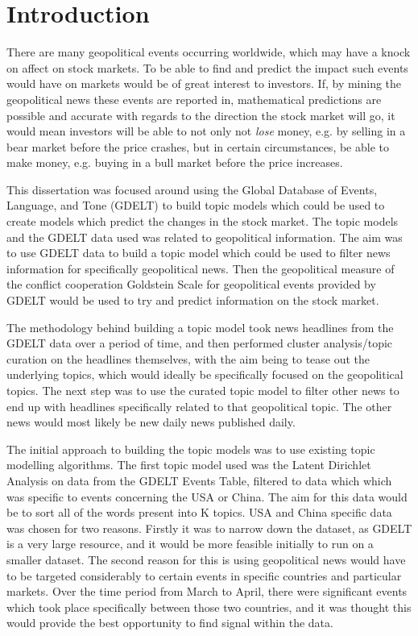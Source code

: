 \section{Introduction}
There are many geopolitical events occurring worldwide, which may have a knock on affect on stock markets. To be able to find and predict the impact such events would have on markets would be of great interest to investors. If, by mining the geopolitical news these events are reported in, mathematical predictions are possible and accurate with regards to the direction the stock market will go, it would mean investors will be able to not only not \textit{lose} money, e.g. by selling in a bear market before the price crashes, but in certain circumstances, be able to make money, e.g. buying in a bull market before the price increases.

This dissertation was focused around using the Global Database of Events, Language, and Tone (GDELT) to build topic models which could be used to create models which predict the changes in the stock market. The topic models and the GDELT data used was related to geopolitical information. The aim was to use GDELT data to build a topic model which could be used to filter news information for specifically geopolitical news. Then the geopolitical measure of the conflict cooperation Goldstein Scale for geopolitical events provided by GDELT would be used to try and predict information on the stock market.

The methodology behind building a topic model took news headlines from the GDELT data over a period of time, and then performed cluster analysis/topic curation on the headlines themselves, with the aim being to tease out the underlying topics, which would ideally be specifically focused on the geopolitical topics. The next step was to use the curated topic model to filter other news to end up with headlines specifically related to that geopolitical topic. The other news would most likely be new daily news published daily. 

The initial approach to building the topic models was to use existing topic modelling algorithms. The first topic model used was the Latent Dirichlet Analysis on data from the GDELT Events Table, filtered to data which which was specific to events concerning the USA or China. The aim for this data would be to sort all of the words present into K topics. USA and China specific data was chosen for two reasons. Firstly it was to narrow down the dataset, as GDELT is a very large resource, and it would be more feasible initially to run on a smaller dataset. The second reason for this is using geopolitical news would have to be targeted considerably to certain events in specific countries and particular markets. Over the time period from March to April, there were significant events which took place specifically between those two countries, and it was thought this would provide the best opportunity to find signal within the data. 

